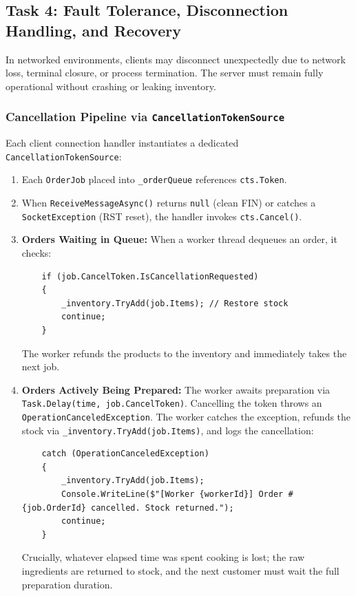 \documentclass[12pt,a4paper]{article}
\begin{document}
\subsection{Task 4: Fault Tolerance, Disconnection Handling, and Recovery}
In networked environments, clients may disconnect unexpectedly due to network loss, terminal closure, or process termination. The server must remain fully operational without crashing or leaking inventory.

\subsubsection{Cancellation Pipeline via \texttt{CancellationTokenSource}}
Each client connection handler instantiates a dedicated \texttt{CancellationTokenSource}:
\begin{enumerate}
    \item Each \texttt{OrderJob} placed into \texttt{\_orderQueue} references \texttt{cts.Token}.
    \item When \texttt{ReceiveMessageAsync()} returns \texttt{null} (clean FIN) or catches a \texttt{SocketException} (RST reset), the handler invokes \texttt{cts.Cancel()}.
    \item \textbf{Orders Waiting in Queue:} When a worker thread dequeues an order, it checks:
    \begin{lstlisting}
    if (job.CancelToken.IsCancellationRequested)
    {
        _inventory.TryAdd(job.Items); // Restore stock
        continue;
    }
    \end{lstlisting}
    The worker refunds the products to the inventory and immediately takes the next job.
    \item \textbf{Orders Actively Being Prepared:} The worker awaits preparation via \linebreak\texttt{Task.Delay(time, job.CancelToken)}. Cancelling the token throws an \texttt{OperationCanceledException}. The worker catches the exception, refunds the stock via \texttt{\_inventory.TryAdd(job.Items)}, and logs the cancellation:
    \begin{lstlisting}
    catch (OperationCanceledException)
    {
        _inventory.TryAdd(job.Items);
        Console.WriteLine($"[Worker {workerId}] Order #{job.OrderId} cancelled. Stock returned.");
        continue;
    }
    \end{lstlisting}
    Crucially, whatever elapsed time was spent cooking is lost; the raw ingredients are returned to stock, and the next customer must wait the full preparation duration.
\end{enumerate}
\end{document}
